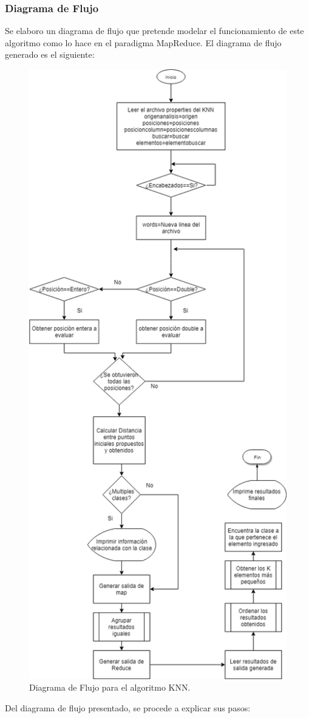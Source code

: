 \subsubsection{Diagrama de Flujo}
Se elaboro un diagrama de flujo que pretende modelar el funcionamiento de este algoritmo como lo hace en el paradigma MapReduce. 
El diagrama de flujo generado es el siguiente:
	\begin{figure}[H]
		\begin{center}
			\hypertarget{fig:diagramaflujo}{\hspace{1pt}}
			\includegraphics[width=.5\textwidth]{capitulo4a/images/KNN.png}
			\caption{Diagrama de Flujo para el algoritmo KNN.}
			\label{fig:diagramaflujo}
		\end{center}
	\end{figure}
Del diagrama de flujo presentado, se procede a explicar sus pasos:
\\
